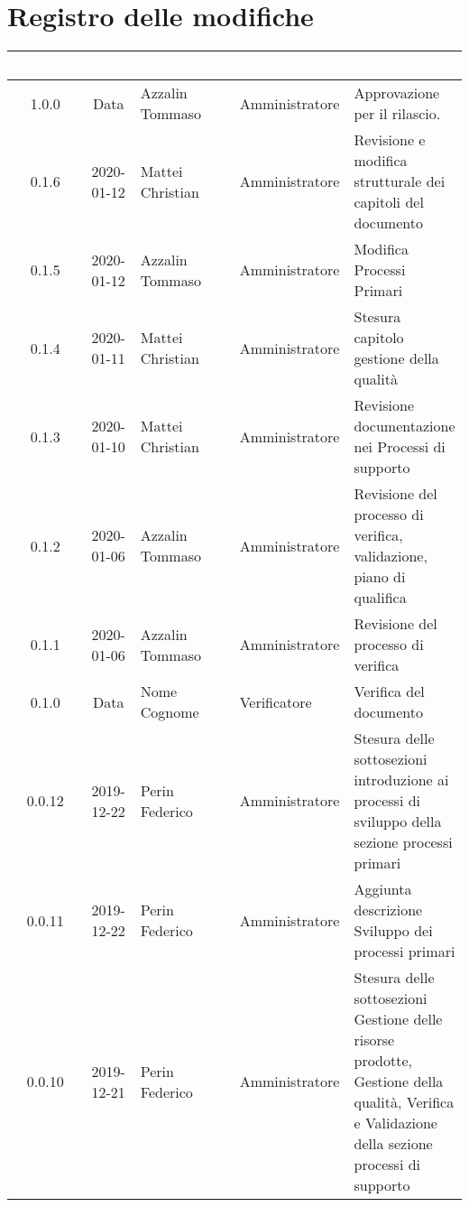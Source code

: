 \section*{Registro delle modifiche}
{
\renewcommand{\arraystretch}{1.5}
\centering
\begin{longtable}{c c  C{4cm}  C{3cm} C{4cm}}
\textcolor{white}{\textbf{Versione}} & \textcolor{white}{\textbf{Data}} & \textcolor{white}{\textbf{Nominativo}} & \textcolor{white}{\textbf{Ruolo}} & \textcolor{white}{\textbf{Descrizione}}\\	
\endhead


1.0.0 & Data & Azzalin Tommaso & Amministratore & Approvazione per il rilascio.  \\

0.1.6 & 2020-01-12 & Mattei Christian & Amministratore & Revisione e modifica strutturale dei capitoli del documento \\

0.1.5 & 2020-01-12 & Azzalin Tommaso & Amministratore & Modifica Processi Primari \\

0.1.4 & 2020-01-11 & Mattei Christian & Amministratore & Stesura capitolo gestione della qualità \\

0.1.3 & 2020-01-10 & Mattei Christian & Amministratore & Revisione documentazione nei Processi di supporto \\

0.1.2 & 2020-01-06 & Azzalin Tommaso & Amministratore & Revisione del processo di verifica, validazione, piano di qualifica \\

0.1.1 & 2020-01-06 & Azzalin Tommaso & Amministratore & Revisione del processo di verifica \\

0.1.0 & Data & Nome Cognome & Verificatore & Verifica del documento \\

0.0.12 & 2019-12-22 & Perin Federico & Amministratore & Stesura delle sottosezioni introduzione ai processi di sviluppo della sezione processi primari\\

0.0.11 & 2019-12-22 & Perin Federico  & Amministratore & Aggiunta descrizione Sviluppo dei processi primari \\

0.0.10 & 2019-12-21 & Perin Federico & Amministratore & Stesura delle sottosezioni Gestione delle risorse prodotte, Gestione della qualità, Verifica e Validazione della sezione processi di supporto \\


\end{longtable}}
